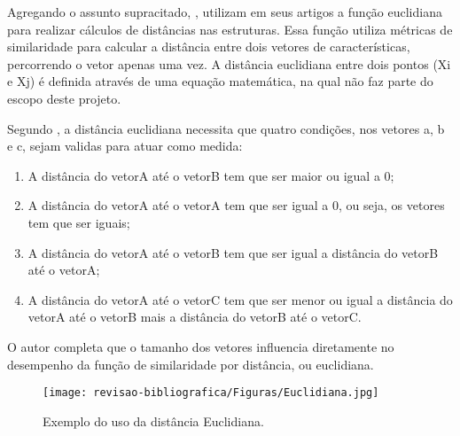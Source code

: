 Agregando o assunto supracitado, ,  utilizam em seus artigos a função euclidiana para realizar cálculos de distâncias nas estruturas. Essa função utiliza métricas de similaridade para calcular a distância entre dois vetores de características, percorrendo o vetor apenas uma vez. A distância euclidiana entre dois pontos (Xi e Xj) é definida através de uma equação matemática, na qual não faz parte do escopo deste projeto.

%

Segundo , a distância euclidiana necessita que quatro condições, nos vetores a, b e c, sejam validas para atuar como medida:

\begin{enumerate}
    \item A distância do vetorA até o vetorB tem que ser maior ou igual a 0;
    \item A distância do vetorA até o vetorA tem que ser igual a 0, ou seja, os vetores tem que ser iguais;
    \item A distância do vetorA até o vetorB tem que ser igual a distância do vetorB até o vetorA;
    \item A distância do vetorA até o vetorC tem que ser menor ou igual a distância do vetorA até o vetorB mais a distância do vetorB até o vetorC.
\end{enumerate}

O autor completa que o tamanho dos vetores influencia diretamente no desempenho da função de similaridade por distância, ou euclidiana.

\clearpage

\begin{figure}[!h]
\caption{{\footnotesize Exemplo do uso da distância Euclidiana.}}
 
\centering %
\texttt{[image: revisao-bibliografica/Figuras/Euclidiana.jpg]}%
\label{figura:figura8}

\centering {}
{
\label{figura:figura8}
}
\end{figure}
